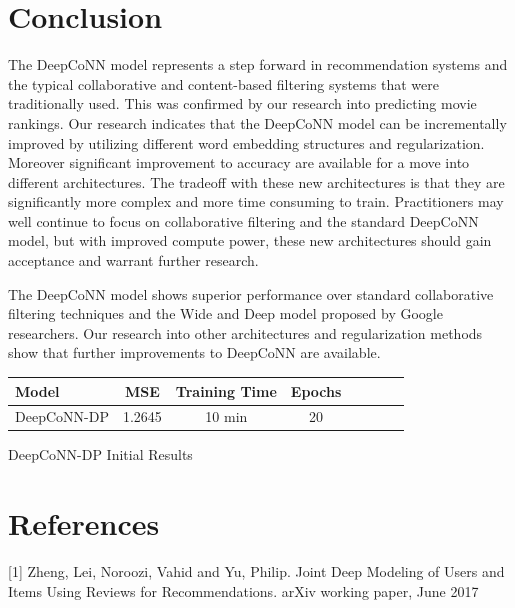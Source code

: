 \documentclass[10pt,twocolumn,letterpaper]{article}
\begin{document}
\section{Conclusion}

The DeepCoNN model represents a step forward in recommendation systems and the typical collaborative and content-based filtering systems that were traditionally used. This was confirmed by our research into predicting movie rankings. Our research indicates that the DeepCoNN model can be incrementally improved by utilizing different word embedding structures and regularization. Moreover significant improvement to accuracy are available for a move into different architectures. The tradeoff with these new architectures is that they are significantly more complex and more time consuming to train. Practitioners may well continue to focus on collaborative filtering and the standard DeepCoNN model, but with improved compute power, these new architectures should gain acceptance and warrant further research.  

The DeepCoNN model shows superior performance over standard collaborative filtering techniques and the Wide and Deep model proposed by Google researchers. Our research into other architectures and regularization methods show that further improvements to DeepCoNN are available.   






\begin{exhibit}
\begin{center}
{\small
\begin{tabular}{l|ccccccc}
\hline
Model & MSE & Training Time & Epochs \\
\hline
DeepCoNN-DP & 1.2645 & 10 min & 20  \\
\hline
\end{tabular}
}
\end{center}
\caption{DeepCoNN-DP Initial Results}
\end{exhibit}


\section{References}

[1] Zheng, Lei, Noroozi, Vahid and Yu, Philip. Joint Deep Modeling of Users
 and Items Using Reviews for Recommendations. arXiv working paper, June 2017
\end{document}

